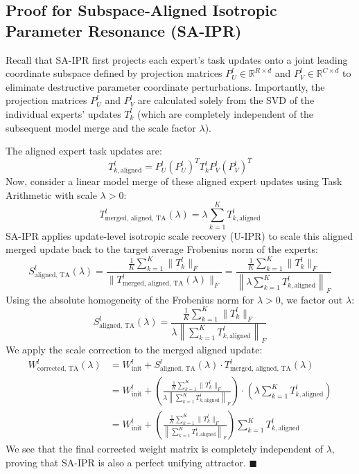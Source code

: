 \documentclass{article}
\begin{document}
\subsection{Proof for Subspace-Aligned Isotropic Parameter Resonance (SA-IPR)}
Recall that SA-IPR first projects each expert's task updates onto a joint leading coordinate subspace defined by projection matrices $P_U^l \in \mathbb{R}^{R \times d}$ and $P_V^l \in \mathbb{R}^{C \times d}$ to eliminate destructive parameter coordinate perturbations. Importantly, the projection matrices $P_U^l$ and $P_V^l$ are calculated solely from the SVD of the individual experts' updates $T_k^l$ (which are completely independent of the subsequent model merge and the scale factor $\lambda$).

The aligned expert task updates are:
\begin{equation}
    T_{k, \text{aligned}}^l = P_U^l (P_U^l)^T T_k^l P_V^l (P_V^l)^T
\end{equation}
Now, consider a linear model merge of these aligned expert updates using Task Arithmetic with scale $\lambda > 0$:
\begin{equation}
    T_{\text{merged, aligned, TA}}^l(\lambda) = \lambda \sum_{k=1}^K T_{k, \text{aligned}}^l
\end{equation}
SA-IPR applies update-level isotropic scale recovery (U-IPR) to scale this aligned merged update back to the target average Frobenius norm of the experts:
\begin{equation}
    S_{\text{aligned, TA}}^l(\lambda) = \frac{\frac{1}{K} \sum_{k=1}^K \|T_k^l\|_F}{\|T_{\text{merged, aligned, TA}}^l(\lambda)\|_F} = \frac{\frac{1}{K} \sum_{k=1}^K \|T_k^l\|_F}{\left\| \lambda \sum_{k=1}^K T_{k, \text{aligned}}^l \right\|_F}
\end{equation}
Using the absolute homogeneity of the Frobenius norm for $\lambda > 0$, we factor out $\lambda$:
\begin{equation}
    S_{\text{aligned, TA}}^l(\lambda) = \frac{\frac{1}{K} \sum_{k=1}^K \|T_k^l\|_F}{\lambda \left\| \sum_{k=1}^K T_{k, \text{aligned}}^l \right\|_F}
\end{equation}
We apply the scale correction to the merged aligned update:
\begin{align}
    W_{\text{corrected, TA}}^l(\lambda) &= W_{\text{init}}^l + S_{\text{aligned, TA}}^l(\lambda) \cdot T_{\text{merged, aligned, TA}}^l(\lambda) \\
    &= W_{\text{init}}^l + \left( \frac{\frac{1}{K} \sum_{k=1}^K \|T_k^l\|_F}{\lambda \left\| \sum_{k=1}^K T_{k, \text{aligned}}^l \right\|_F} \right) \cdot \left( \lambda \sum_{k=1}^K T_{k, \text{aligned}}^l \right) \\
    &= W_{\text{init}}^l + \left( \frac{\frac{1}{K} \sum_{k=1}^K \|T_k^l\|_F}{\left\| \sum_{k=1}^K T_{k, \text{aligned}}^l \right\|_F} \right) \sum_{k=1}^K T_{k, \text{aligned}}^l
\end{align}
We see that the final corrected weight matrix is completely independent of $\lambda$, proving that SA-IPR is also a perfect unifying attractor. $\blacksquare$
\end{document}
